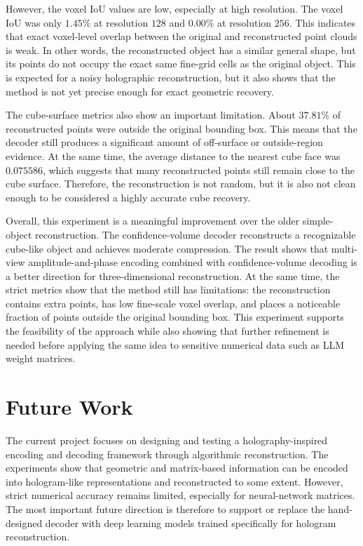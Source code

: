 \documentclass{article}
\begin{document}
\begin{normalsize}
However, the voxel IoU values are low, especially at high resolution. The voxel IoU was only \(1.45\%\) at resolution \(128\) and \(0.00\%\) at resolution \(256\). This indicates that exact voxel-level overlap between the original and reconstructed point clouds is weak. In other words, the reconstructed object has a similar general shape, but its points do not occupy the exact same fine-grid cells as the original object. This is expected for a noisy holographic reconstruction, but it also shows that the method is not yet precise enough for exact geometric recovery.

The cube-surface metrics also show an important limitation. About \(37.81\%\) of reconstructed points were outside the original bounding box. This means that the decoder still produces a significant amount of off-surface or outside-region evidence. At the same time, the average distance to the nearest cube face was \(0.075586\), which suggests that many reconstructed points still remain close to the cube surface. Therefore, the reconstruction is not random, but it is also not clean enough to be considered a highly accurate cube recovery.

Overall, this experiment is a meaningful improvement over the older simple-object reconstruction. The confidence-volume decoder reconstructs a recognizable cube-like object and achieves moderate compression. The result shows that multi-view amplitude-and-phase encoding combined with confidence-volume decoding is a better direction for three-dimensional reconstruction. At the same time, the strict metrics show that the method still has limitations: the reconstruction contains extra points, has low fine-scale voxel overlap, and places a noticeable fraction of points outside the original bounding box. This experiment supports the feasibility of the approach while also showing that further refinement is needed before applying the same idea to sensitive numerical data such as LLM weight matrices.

\section{Future Work}

The current project focuses on designing and testing a holography-inspired encoding and decoding framework through algorithmic reconstruction. The experiments show that geometric and matrix-based information can be encoded into hologram-like representations and reconstructed to some extent. However, strict numerical accuracy remains limited, especially for neural-network matrices. The most important future direction is therefore to support or replace the hand-designed decoder with deep learning models trained specifically for hologram reconstruction.


\end{normalsize}
\end{document}
